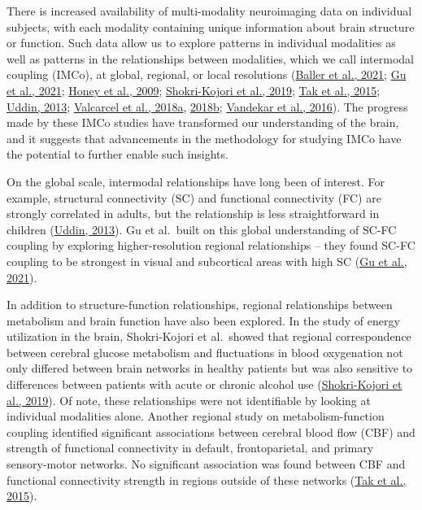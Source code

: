 \documentclass[
  12pt,
]{article}
\begin{document}
There is increased availability of multi-modality neuroimaging data on individual subjects, with each modality containing unique information about brain structure or function. Such data allow us to explore patterns in individual modalities as well as patterns in the relationships between modalities, which we call intermodal coupling (IMCo), at global, regional, or local resolutions (\protect\hyperlink{ref-ballerDevelopmentalCouplingCerebral2021}{Baller et al., 2021}; \protect\hyperlink{ref-guHeritabilityInterindividualVariability2021}{Gu et al., 2021}; \protect\hyperlink{ref-honeyPredictingHumanRestingstate2009}{Honey et al., 2009}; \protect\hyperlink{ref-shokri-kojoriCorrespondenceCerebralGlucose2019}{Shokri-Kojori et al., 2019}; \protect\hyperlink{ref-takAssociationsRestingStateFMRI2015}{Tak et al., 2015}; \protect\hyperlink{ref-uddinComplexRelationshipsStructural2013}{Uddin, 2013}; \protect\hyperlink{ref-valcarcelDualModelingApproach2018}{Valcarcel et al., 2018a}, \protect\hyperlink{ref-valcarcelMIMoSAAutomatedMethod2018}{2018b}; \protect\hyperlink{ref-vandekarSubjectlevelMeasurementLocal2016}{Vandekar et al., 2016}). The progress made by these IMCo studies have transformed our understanding of the brain, and it suggests that advancements in the methodology for studying IMCo have the potential to further enable such insights.

On the global scale, intermodal relationships have long been of interest. For example, structural connectivity (SC) and functional connectivity (FC) are strongly correlated in adults, but the relationship is less straightforward in children (\protect\hyperlink{ref-uddinComplexRelationshipsStructural2013}{Uddin, 2013}). Gu et al.~built on this global understanding of SC-FC coupling by exploring higher-resolution regional relationships -- they found SC-FC coupling to be strongest in visual and subcortical areas with high SC (\protect\hyperlink{ref-guHeritabilityInterindividualVariability2021}{Gu et al., 2021}).

In addition to structure-function relationships, regional relationships between metabolism and brain function have also been explored. In the study of energy utilization in the brain, Shokri-Kojori et al.~showed that regional correspondence between cerebral glucose metabolism and fluctuations in blood oxygenation not only differed between brain networks in healthy patients but was also sensitive to differences between patients with acute or chronic alcohol use (\protect\hyperlink{ref-shokri-kojoriCorrespondenceCerebralGlucose2019}{Shokri-Kojori et al., 2019}). Of note, these relationships were not identifiable by looking at individual modalities alone. Another regional study on metabolism-function coupling identified significant associations between cerebral blood flow (CBF) and strength of functional connectivity in default, frontoparietal, and primary sensory-motor networks. No significant association was found between CBF and functional connectivity strength in regions outside of these networks (\protect\hyperlink{ref-takAssociationsRestingStateFMRI2015}{Tak et al., 2015}).
\end{document}
